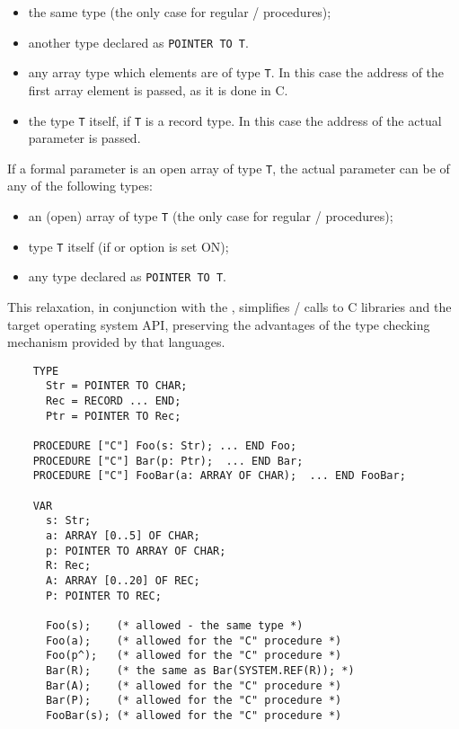 \begin{itemize}
\item the same type (the only case for regular \mt{}/\ot{}
      procedures);
\item another type declared as \verb'POINTER TO T'.
\item any array type which elements are of type {\tt T}.
      In this case the address of the first array element is passed,
      as it is done in C.
\item the type {\tt T} itself, if {\tt T} is a record type.
      In this case the address of the actual parameter is passed.
\end{itemize}

If a formal parameter is an open array of type \verb'T',
the actual parameter can be of any of the following types:

\begin{itemize}
\item an (open) array of type \verb'T' (the only case for regular \mt{}/\ot{}
      procedures);
\item type \verb'T' itself (if \iftopspeed or \fi
      option is set ON);
\item any type declared as \verb'POINTER TO T'.
\end{itemize}

This relaxation, in conjunction with the
,
simplifies \mt{}/\ot{} calls to C libraries and the target operating
system API, preserving the advantages of the type checking mechanism
provided by that languages.

\Example
\begin{verbatim}
    TYPE
      Str = POINTER TO CHAR;
      Rec = RECORD ... END;
      Ptr = POINTER TO Rec;

    PROCEDURE ["C"] Foo(s: Str); ... END Foo;
    PROCEDURE ["C"] Bar(p: Ptr);  ... END Bar;
    PROCEDURE ["C"] FooBar(a: ARRAY OF CHAR);  ... END FooBar;

    VAR
      s: Str;
      a: ARRAY [0..5] OF CHAR;
      p: POINTER TO ARRAY OF CHAR;
      R: Rec;
      A: ARRAY [0..20] OF REC;
      P: POINTER TO REC;

      Foo(s);    (* allowed - the same type *)
      Foo(a);    (* allowed for the "C" procedure *)
      Foo(p^);   (* allowed for the "C" procedure *)
      Bar(R);    (* the same as Bar(SYSTEM.REF(R)); *)
      Bar(A);    (* allowed for the "C" procedure *)
      Bar(P);    (* allowed for the "C" procedure *)
      FooBar(s); (* allowed for the "C" procedure *)
\end{verbatim}

